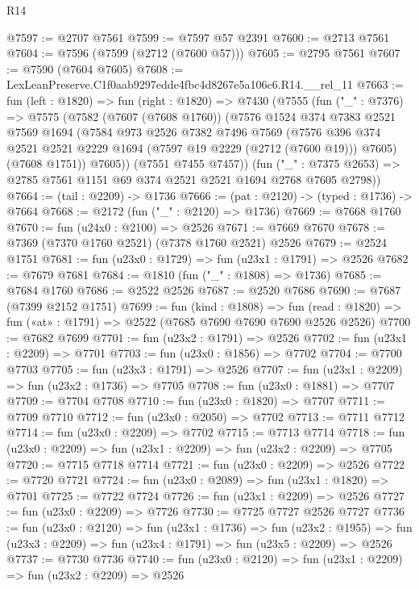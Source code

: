 \begin{lexlean}{R14}
\begin{coremodule}
@7597 := @2707 @7561
@7599 := @7597 @57 @2391
@7600 := @2713 @7561
@7604 := @7596 (@7599 (@2712 (@7600 @57)))
@7605 := @2795 @7561
@7607 := @7590 (@7604 @7605)
@7608 := LexLeanPreserve.C1f0aab9297edde4fbc4d8267e5a106c6.R14.__rel_11
@7663 := fun (left : @1820) =>
  fun (right : @1820) =>
  @7430
    (@7555
      (fun ("_" : @7376) =>
      @7575
        (@7582
          (@7607 (@7608 @1760))
          (@7576
            @1524
            @374
            @7383
            @2521
            @7569
            @1694
            (@7584
              @973
              @2526
              @7382
              @7496
              @7569
              (@7576 @396 @374 @2521 @2521 @2229 @1694 (@7597 @19 @2229 (@2712 (@7600 @19))) @7605)
              (@7608 @1751))
            @7605))
        (@7551 @7455 @7457))
      (fun ("_" : @7375 @2653) => @2785 @7561 @1151 @69 @374 @2521 @2521 @1694 @2768 @7605 @2798))
@7664 := (tail : @2209) -> @1736
@7666 := (pat : @2120) -> (typed : @1736) -> @7664
@7668 := @2172 (fun ("_" : @2120) => @1736)
@7669 := @7668 @1760
@7670 := fun (u24x0 : @2100) => @2526
@7671 := @7669 @7670
@7678 := @7369 (@7370 @1760 @2521) (@7378 @1760 @2521) @2526
@7679 := @2524 @1751
@7681 := fun (u23x0 : @1729) => fun (u23x1 : @1791) => @2526
@7682 := @7679 @7681
@7684 := @1810 (fun ("_" : @1808) => @1736)
@7685 := @7684 @1760
@7686 := @2522 @2526
@7687 := @2520 @7686
@7690 := @7687 (@7399 @2152 @1751)
@7699 := fun (kind : @1808) =>
  fun (read : @1820) => fun («at» : @1791) => @2522 (@7685 @7690 @7690 @7690 @2526 @2526)
@7700 := @7682 @7699
@7701 := fun (u23x2 : @1791) => @2526
@7702 := fun (u23x1 : @2209) => @7701
@7703 := fun (u23x0 : @1856) => @7702
@7704 := @7700 @7703
@7705 := fun (u23x3 : @1791) => @2526
@7707 := fun (u23x1 : @2209) => fun (u23x2 : @1736) => @7705
@7708 := fun (u23x0 : @1881) => @7707
@7709 := @7704 @7708
@7710 := fun (u23x0 : @1820) => @7707
@7711 := @7709 @7710
@7712 := fun (u23x0 : @2050) => @7702
@7713 := @7711 @7712
@7714 := fun (u23x0 : @2209) => @7702
@7715 := @7713 @7714
@7718 := fun (u23x0 : @2209) => fun (u23x1 : @2209) => fun (u23x2 : @2209) => @7705
@7720 := @7715 @7718 @7714
@7721 := fun (u23x0 : @2209) => @2526
@7722 := @7720 @7721
@7724 := fun (u23x0 : @2089) => fun (u23x1 : @1820) => @7701
@7725 := @7722 @7724
@7726 := fun (u23x1 : @2209) => @2526
@7727 := fun (u23x0 : @2209) => @7726
@7730 := @7725 @7727 @2526 @7727
@7736 := fun (u23x0 : @2120) =>
  fun (u23x1 : @1736) =>
  fun (u23x2 : @1955) => fun (u23x3 : @2209) => fun (u23x4 : @1791) => fun (u23x5 : @2209) => @2526
@7737 := @7730 @7736
@7740 := fun (u23x0 : @2120) => fun (u23x1 : @2209) => fun (u23x2 : @2209) => @2526

\end{coremodule}
\end{lexlean}
